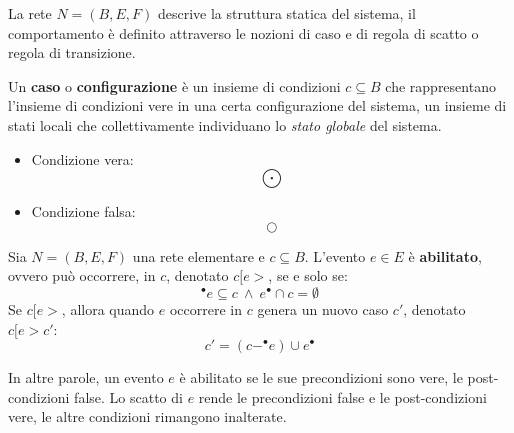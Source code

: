 La rete $N = (B, E, F)$ descrive la struttura statica del sistema, il
comportamento è definito attraverso le nozioni di caso e di regola di scatto o
regola di transizione.

Un \textbf{caso} o \textbf{configurazione} è un insieme di condizioni $c \subseteq B$
che rappresentano l'insieme di condizioni vere in una certa configurazione del
sistema, un insieme di stati locali che collettivamente individuano lo
\textit{stato globale} del sistema.
\begin{itemize}
    \item Condizione vera: $$\bigodot$$
    \item Condizione falsa: $$\bigcirc$$
\end{itemize}
\begin{definizione} 
    Sia $N = (B, E, F)$ una rete elementare e $c \subseteq B$. L'evento $e \in E$
    è \textbf{abilitato}, ovvero può occorrere, in $c$, denotato $c[e >$, se e
    solo se:
    \begin{equation}
        ^{\bullet} e \subseteq c \ \land \ e^{\bullet} \cap c = \emptyset
    \end{equation}
    Se $c[e >$, allora quando $e$ occorrere in $c$ genera un nuovo caso $c'$,
    denotato $c[e > c'$:
    \begin{equation}
        c' = (c - ^{\bullet} e) \cup e^{\bullet}
    \end{equation}
\end{definizione}
In altre parole, un evento $e$ è abilitato se le sue precondizioni sono vere,
le post-condizioni false. Lo scatto di $e$ rende le precondizioni false e le
post-condizioni vere, le altre condizioni rimangono inalterate.

